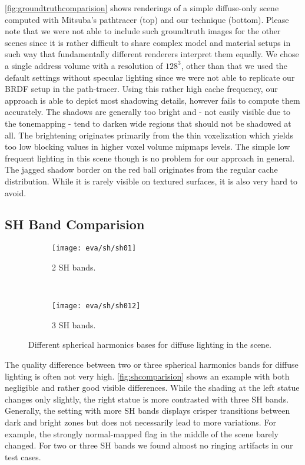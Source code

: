 \documentclass[thesis.tex]{subfiles}
\begin{document}
\autoref{fig:groundtruthcomparision} shows renderings of a simple diffuse-only scene computed with Mitsuba's pathtracer \cite{bib:mitsuba} (top) and our technique (bottom).
Please note that we were not able to include such groundtruth images for the other scenes since it is rather difficult to share complex model and material setups in such way that fundamentally different renderers interpret them equally.
We chose a single address volume with a resolution of $128^3$, other than that we used the default settings without specular lighting since we were not able to replicate our BRDF setup in the path-tracer.
Using this rather high cache frequency, our approach is able to depict most shadowing details, however fails to compute them accurately.
The shadows are generally too bright and - not easily visible due to the tonemapping - tend to darken wide regions that should not be shadowed at all.
The brightening originates primarily from the thin voxelization which yields too low blocking values in higher voxel volume mipmaps levels.
The simple low frequent lighting in this scene though is no problem for our approach in general.
The jagged shadow border on the red ball originates from the regular cache distribution.
While it is rarely visible on textured surfaces, it is also very hard to avoid.

\subsection{SH Band Comparision} \label{sec:eva:shquality}
\begin{figure}[h]
\centering
\begin{subfigure}[b]{0.9\textwidth}
\texttt{[image: eva/sh/sh01]}
\caption{2 SH bands.}
\end{subfigure}
\\
\begin{subfigure}[b]{0.9\textwidth}
\texttt{[image: eva/sh/sh012]}
\caption{3 SH bands.}
\end{subfigure}
\caption{Different spherical harmonics bases for diffuse lighting in the  scene.}
\label{fig:shcomparision}
\end{figure}
The quality difference between two or three spherical harmonics bands for diffuse lighting is often not very high.
\autoref{fig:shcomparision} shows an example with both negligible and rather good visible differences.
While the shading at the left statue changes only slightly, the right statue is more contrasted with three SH bands.
Generally, the setting with more SH bands displays crisper transitions between dark and bright zones but does not necessarily lead to more variations.
For example, the strongly normal-mapped flag in the middle of the scene barely changed.
For two or three SH bands we found almost no ringing artifacts in our test cases.
\end{document}

